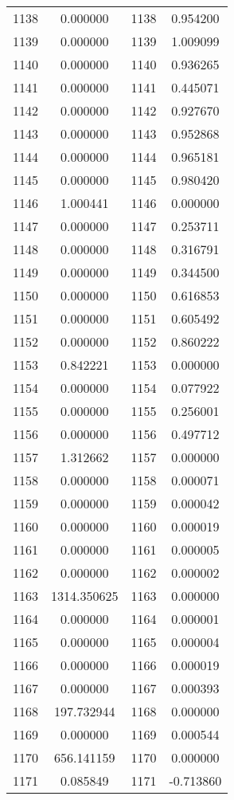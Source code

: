 \documentclass[12pt]{article}
\begin{document}
\begin{longtable}{@{}cccc@{}}
1138 & 0.000000 & 1138 & 0.954200 \\
1139 & 0.000000 & 1139 & 1.009099 \\
1140 & 0.000000 & 1140 & 0.936265 \\
1141 & 0.000000 & 1141 & 0.445071 \\
1142 & 0.000000 & 1142 & 0.927670 \\
1143 & 0.000000 & 1143 & 0.952868 \\
1144 & 0.000000 & 1144 & 0.965181 \\
1145 & 0.000000 & 1145 & 0.980420 \\
1146 & 1.000441 & 1146 & 0.000000 \\
1147 & 0.000000 & 1147 & 0.253711 \\
1148 & 0.000000 & 1148 & 0.316791 \\
1149 & 0.000000 & 1149 & 0.344500 \\
1150 & 0.000000 & 1150 & 0.616853 \\
1151 & 0.000000 & 1151 & 0.605492 \\
1152 & 0.000000 & 1152 & 0.860222 \\
1153 & 0.842221 & 1153 & 0.000000 \\
1154 & 0.000000 & 1154 & 0.077922 \\
1155 & 0.000000 & 1155 & 0.256001 \\
1156 & 0.000000 & 1156 & 0.497712 \\
1157 & 1.312662 & 1157 & 0.000000 \\
1158 & 0.000000 & 1158 & 0.000071 \\
1159 & 0.000000 & 1159 & 0.000042 \\
1160 & 0.000000 & 1160 & 0.000019 \\
1161 & 0.000000 & 1161 & 0.000005 \\
1162 & 0.000000 & 1162 & 0.000002 \\
1163 & 1314.350625 & 1163 & 0.000000 \\
1164 & 0.000000 & 1164 & 0.000001 \\
1165 & 0.000000 & 1165 & 0.000004 \\
1166 & 0.000000 & 1166 & 0.000019 \\
1167 & 0.000000 & 1167 & 0.000393 \\
1168 & 197.732944 & 1168 & 0.000000 \\
1169 & 0.000000 & 1169 & 0.000544 \\
1170 & 656.141159 & 1170 & 0.000000 \\
1171 & 0.085849 & 1171 & -0.713860 \\

\end{longtable}
\end{document}

